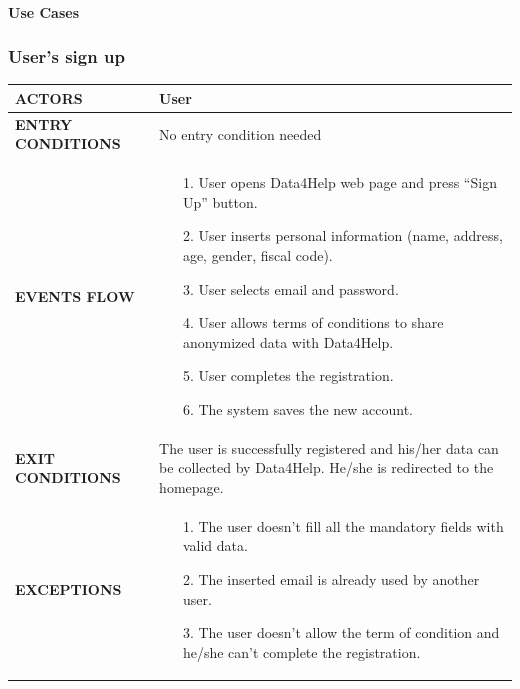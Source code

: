 \documentclass[a4paper]{article}
\begin{document}
\clearpage

\paragraph{Use Cases}
\subsubsection{User's sign up}

\begin{center}
\begin{tabular}{|l || p{8cm} ||}
    \hline\bf{ACTORS} & User \\ 
    \hline
    \bf{ENTRY CONDITIONS} & No entry condition needed  \\ 
    \hline
    \bf{EVENTS FLOW} & \begin{itemize}[noitemsep, topsep=0cm, leftmargin=*] \vspace{-0.2cm}
        \item[1.] User opens Data4Help web page and press “Sign Up” button.
        \item[2.] User inserts personal information (name, address, age, gender, fiscal code).
        \item[3.] User selects email and password.
        \item[4.] User allows terms of conditions to share anonymized data with Data4Help.
        \item[5.] User completes the registration.
        \item[6.] The system saves the new account.
    \end{itemize}\\ 
    \hline
    \bf{EXIT CONDITIONS} & The user is successfully registered and his/her data can be collected by Data4Help. He/she is redirected to the homepage. \\ \hline
    \bf{EXCEPTIONS} & \begin{itemize}[noitemsep, topsep=0cm, leftmargin=*] \vspace{-0.2cm}
        \item[1.] The user doesn’t fill all the mandatory fields with valid data.
        \item[2.]The inserted email is already used by another user.
        \item[3.] The user doesn’t allow the term of condition and he/she can’t complete the registration.
    \end{itemize}
    \\ \hline \hline
\end{tabular}
\end{center}
\end{document}
